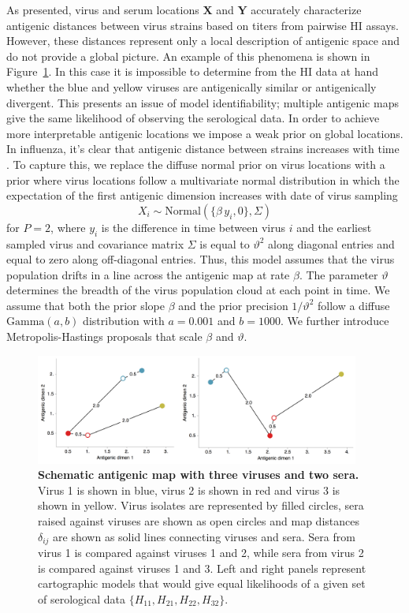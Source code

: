 \documentclass[11pt,oneside,letterpaper]{article}
\newcommand{\driftsd}{\vartheta}					%
\begin{document}
As presented, virus and serum locations $\mathbf{X}$ and $\mathbf{Y}$ accurately characterize antigenic distances between virus strains based on titers from pairwise HI assays.
However, these distances represent only a local description of antigenic space and do not provide a global picture.
An example of this phenomena is shown in Figure~\ref{schematic_map}.
In this case it is impossible to determine from the HI data at hand whether the blue and yellow viruses are antigenically similar or antigenically divergent. 
This presents an issue of model identifiability; multiple antigenic maps give the same likelihood of observing the serological data.
In order to achieve more interpretable antigenic locations we impose a weak prior on global locations.
In influenza, it's clear that antigenic distance between strains increases with time \cite{Smith04,Cai10}.
To capture this, we replace the diffuse normal prior on virus locations with a prior where virus locations follow a multivariate normal distribution in which the expectation of the first antigenic dimension increases with date of virus sampling
\begin{equation} 
	X_{i} \sim \mbox{Normal}( \{\beta \, y_i, 0\}, \Sigma )
\end{equation}
for $P=2$, where $y_i$ is the difference in time between virus $i$ and the earliest sampled virus and covariance matrix $\Sigma$ is equal to $\driftsd^2$ along diagonal entries and equal to zero along off-diagonal entries.
Thus, this model assumes that the virus population drifts in a line across the antigenic map at rate $\beta$.
The parameter $\driftsd$ determines the breadth of the virus population cloud at each point in time.
We assume that both the prior slope $\beta$ and the prior precision $1/\driftsd^2$ follow a diffuse $\mbox{Gamma}(a, b)$ distribution with $a=0.001$ and $b=1000$.
We further introduce Metropolis-Hastings proposals that scale $\beta$ and $\driftsd$.

\begin{figure}[tb]
	\centering		
	\includegraphics[width=0.95\textwidth]{figures/schematic_map}
	\caption{\textbf{Schematic antigenic map with three viruses and two sera.} 
	Virus 1 is shown in blue, virus 2 is shown in red and virus 3 is shown in yellow.
	Virus isolates are represented by filled circles, sera raised against viruses are shown as open circles and map distances $\delta_{ij}$ are shown as solid lines connecting viruses and sera.
	Sera from virus 1 is compared against viruses 1 and 2, while sera from virus 2 is compared against viruses 1 and 3.
	Left and right panels represent cartographic models that would give equal likelihoods of a given set of serological data $\{H_{11},H_{21},H_{22},H_{32}\}$.
	} 
	\label{schematic_map} 
\end{figure}
\end{document}
